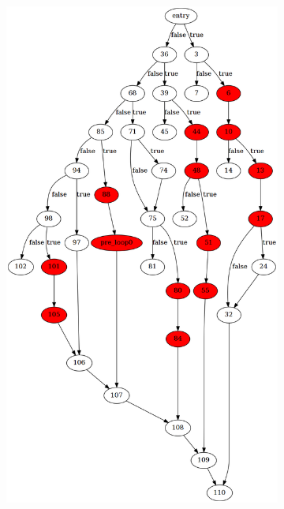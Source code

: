 \begin{figure}[htbp]
	\centering
	\begin{subfigure}[ht]{0.45\textwidth}
		\includegraphics[width=\textwidth]{inc/appendices/control_flow_analysis_example/step2_before.png}
	\end{subfigure}
	\qquad
	\begin{subfigure}[ht]{0.45\textwidth}

\end{subfigure}
\end{figure}
